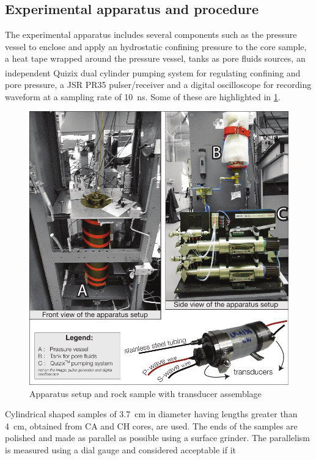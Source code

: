 \subsection{Experimental apparatus and procedure}
\label{sc:experimental_apparatus}
The experimental apparatus includes several components such as the pressure
vessel to enclose and apply an hydrostatic confining pressure to the core
sample, a heat tape wrapped around the pressure vessel, tanks as pore fluids
sources, an independent Quizix\textsuperscript{\texttrademark} dual cylinder
pumping system for regulating confining and pore pressure, a JSR PR35
pulser/receiver and a digital oscilloscope for recording waveform at a sampling
rate of \SI{10}{\ns}. Some of these are highlighted in \cref{fig:apparatus}.\\
\begin{figure}[!ht]
\centering
\includegraphics[width=1\textwidth]{fig/apparatus.pdf}
\caption{Apparatus setup and rock sample with transducer assemblage}
\label{fig:apparatus}
\end{figure}
Cylindrical shaped samples of \SI{3.7}{\cm} in diameter having lengths greater
than \SI{4}{\cm}, obtained from CA and CH cores, are used. The ends of the
samples are polished and made as parallel as possible using a surface grinder.
The parallelism is measured using a dial gauge and considered acceptable if it
